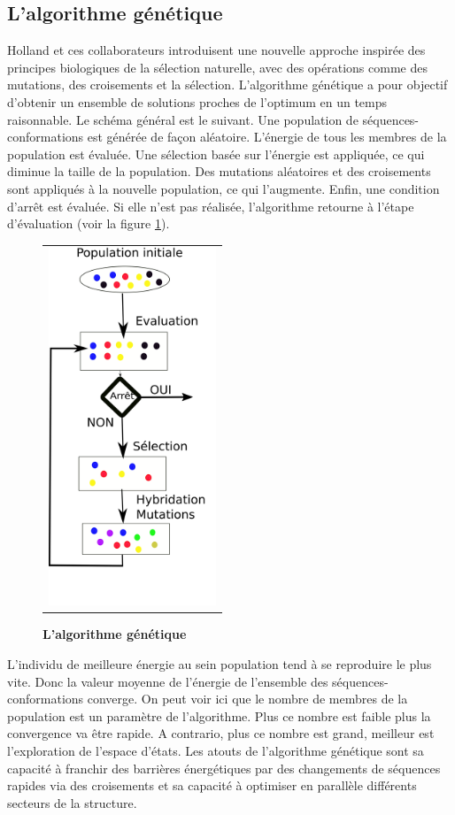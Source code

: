 \subsection{L'algorithme génétique}

Holland et ces collaborateurs \cite{Goldberg88} introduisent une nouvelle approche inspirée des principes biologiques de la sélection naturelle, avec des opérations comme des mutations, des croisements et la sélection. L'algorithme génétique a pour objectif d'obtenir un ensemble de solutions proches de l'optimum en un temps raisonnable.
Le schéma général est le suivant. Une population de séquences-conformations est générée de façon aléatoire. L'énergie de tous les membres de la population est évaluée. Une sélection basée sur l'énergie est appliquée, ce qui diminue la taille de la population. Des mutations aléatoires et des croisements sont appliqués à la nouvelle population, ce qui l'augmente. Enfin, une condition d'arrêt est évaluée. Si elle n'est pas réalisée, l'algorithme retourne à l'étape d'évaluation (voir la figure \ref{fig:algo_gene}). 

\begin{figure}[!h]
  \centering
  \begin{tabular}{c}
    \includegraphics[width=5cm]{figure/algo_genetique.png} \\
  \end{tabular}
  \caption{\textbf{L'algorithme génétique}}
  \label{fig:algo_gene}
\end{figure}


L'individu de meilleure énergie au sein population tend à se reproduire le plus vite. Donc la valeur moyenne de l'énergie de l'ensemble des séquences-conformations converge. On peut voir ici que le nombre de membres de la population est un paramètre de l'algorithme. Plus ce nombre est faible plus la convergence va être rapide. A contrario, plus ce nombre est grand, meilleur est l'exploration de l'espace d'états. Les atouts de l'algorithme génétique sont sa capacité à franchir des barrières énergétiques par des changements de séquences rapides via des croisements et sa capacité à optimiser en parallèle différents secteurs de la structure.

